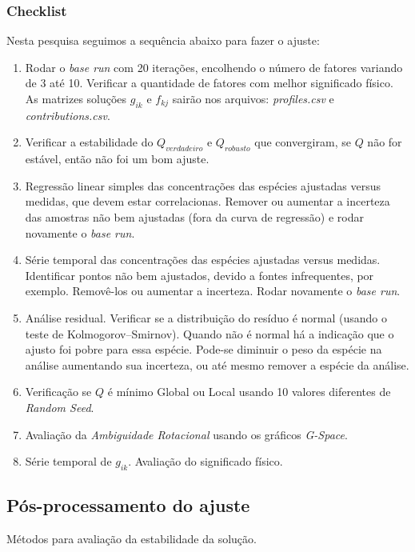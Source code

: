 \subsubsection{Checklist}
Nesta pesquisa seguimos a sequência abaixo para fazer o ajuste:
\begin{enumerate}
  \item Rodar o \textit{base run} com 20 iterações, encolhendo o número de fatores variando de 3 até 10. Verificar a quantidade de fatores com melhor significado físico. As matrizes soluções $g_{ik}$ e $f_{kj}$ sairão nos arquivos: \textit{profiles.csv} e \textit{contributions.csv}.
  \item Verificar a estabilidade do $Q_{verdadeiro}$ e $Q_{robusto}$ que convergiram, se $Q$ não for estável, então não foi um bom ajuste.
  \item Regressão linear simples das concentrações das espécies ajustadas versus medidas, que devem estar correlacionas. Remover ou aumentar a incerteza das amostras não bem ajustadas (fora da curva de regressão) e rodar novamente o \textit{base run}.  
  \item Série temporal das concentrações das espécies ajustadas versus medidas. Identificar pontos não bem ajustados, devido a fontes infrequentes, por exemplo. Removê-los ou aumentar a incerteza. Rodar novamente o \textit{base run}.
  \item Análise residual. Verificar se a distribuição do resíduo é normal (usando o teste de Kolmogorov–Smirnov). Quando não é normal há a indicação que o ajusto foi pobre para essa espécie. Pode-se diminuir o peso da espécie na análise aumentando sua incerteza, ou até mesmo remover a espécie da análise.
  \item Verificação se $Q$ é mínimo Global ou Local usando 10 valores diferentes de \textit{Random Seed}.
  \item Avaliação da \textit{Ambiguidade Rotacional} usando os gráficos \textit{G-Space}.
  \item Série temporal de $g_{ik}$. Avaliação do significado físico.
\end{enumerate}

\subsection{Pós-processamento do ajuste}
Métodos para avaliação da estabilidade da solução.

 
